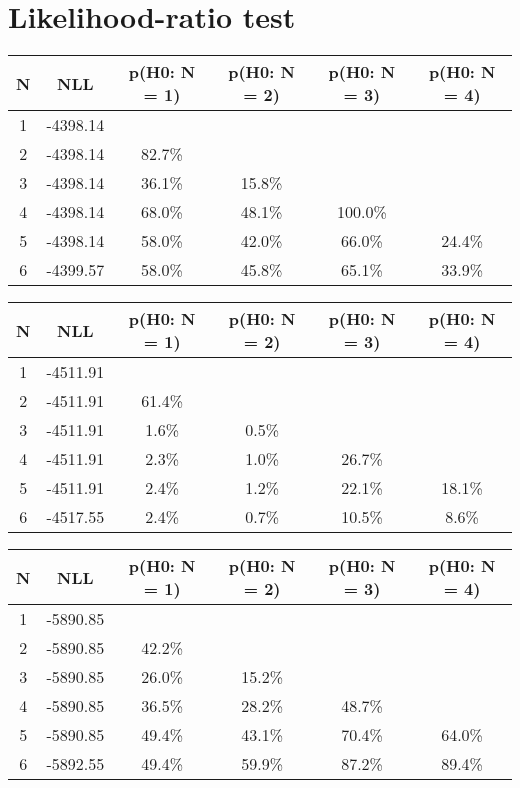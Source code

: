 \section{Likelihood-ratio test}
\begin{table}[h!]
	\centering
	\begin{tabular}{cc||cccc}
		N & NLL & p(H0: N = 1) & p(H0: N = 2) & p(H0: N = 3) & p(H0: N = 4)\\ 
		\hline
1 & -4398.14 & & & & \\
2 & -4398.14 & 82.7\% & & & \\
3 & -4398.14 & 36.1\% & 15.8\% & & \\
4 & -4398.14 & 68.0\% & 48.1\% & 100.0\% & \\
5 & -4398.14 & 58.0\% & 42.0\% & 66.0\% & 24.4\% \\
6 & -4399.57 & 58.0\% & 45.8\% & 65.1\% & 33.9\% \\
	\end{tabular}
	\label{tab:lab}
\end{table}

\begin{table}[h!]
	\centering
	\begin{tabular}{cc||cccc}
		N & NLL & p(H0: N = 1) & p(H0: N = 2) & p(H0: N = 3) & p(H0: N = 4)\\ 
		\hline
1 & -4511.91 & & & & \\
2 & -4511.91 & 61.4\% & & & \\
3 & -4511.91 & 1.6\% & 0.5\% & & \\
4 & -4511.91 & 2.3\% & 1.0\% & 26.7\% & \\
5 & -4511.91 & 2.4\% & 1.2\% & 22.1\% & 18.1\% \\
6 & -4517.55 & 2.4\% & 0.7\% & 10.5\% & 8.6\% \\
	\end{tabular}
	\label{tab:lab}
\end{table}

\begin{table}[h!]
	\centering
	\begin{tabular}{cc||cccc}
		N & NLL & p(H0: N = 1) & p(H0: N = 2) & p(H0: N = 3) & p(H0: N = 4)\\ 
		\hline
1 & -5890.85 & & & & \\
2 & -5890.85 & 42.2\% & & & \\
3 & -5890.85 & 26.0\% & 15.2\% & & \\
4 & -5890.85 & 36.5\% & 28.2\% & 48.7\% & \\
5 & -5890.85 & 49.4\% & 43.1\% & 70.4\% & 64.0\% \\
6 & -5892.55 & 49.4\% & 59.9\% & 87.2\% & 89.4\% \\
	\end{tabular}
	\label{tab:lab}
\end{table}


